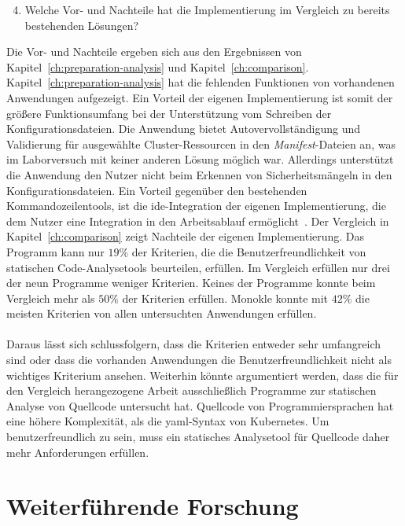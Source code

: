 \begin{enumerate}
    \setcounter{enumi}{3}
    \item Welche Vor- und Nachteile hat die Implementierung im Vergleich zu bereits bestehenden Lösungen?
\end{enumerate}

Die Vor- und Nachteile ergeben sich aus den Ergebnissen von Kapitel~\ref{ch:preparation-analysis} und Kapitel~\ref{ch:comparison}.
Kapitel~\ref{ch:preparation-analysis} hat die fehlenden Funktionen von vorhandenen Anwendungen aufgezeigt. Ein Vorteil der eigenen Implementierung ist
somit der größere Funktionsumfang bei der Unterstützung vom Schreiben der Konfigurationsdateien.
Die Anwendung bietet Autovervollständigung und Validierung für ausgewählte Cluster-Ressourcen in den \textit{Manifest}-Dateien an, was im Laborversuch
mit keiner anderen Lösung möglich war. Allerdings unterstützt die Anwendung den Nutzer nicht beim Erkennen von Sicherheitsmängeln in
den Konfigurationsdateien. Ein Vorteil gegenüber den bestehenden
Kommandozeilentools, ist die \ac{ide}-Integration der eigenen Implementierung, die dem Nutzer eine Integration in den Arbeitsablauf ermöglicht~\cite{usability-criteria-static-analysis-tools}.
Der Vergleich in Kapitel~\ref{ch:comparison} zeigt Nachteile der eigenen Implementierung. Das Programm kann nur $19\%$ der Kriterien, die die
Benutzerfreundlichkeit von statischen Code-Analysetools beurteilen, erfüllen. Im Vergleich erfüllen nur drei der neun Programme weniger Kriterien.
Keines der Programme konnte beim Vergleich mehr als $50\%$ der Kriterien erfüllen.
Monokle konnte mit $42\%$ die meisten Kriterien von allen untersuchten Anwendungen erfüllen.
\\\\
Daraus lässt sich schlussfolgern, dass die Kriterien entweder sehr umfangreich sind oder dass die vorhanden Anwendungen
die Benutzerfreundlichkeit nicht als wichtiges Kriterium ansehen.
Weiterhin könnte argumentiert werden, dass die für den Vergleich herangezogene Arbeit ausschließlich Programme zur statischen Analyse
von Quellcode untersucht hat. Quellcode von Programmiersprachen hat eine höhere Komplexität, als die \ac{yaml}-Syntax von Kubernetes.
Um benutzerfreundlich zu sein, muss ein statisches Analysetool für Quellcode daher mehr Anforderungen erfüllen.

\section{Weiterführende Forschung}


